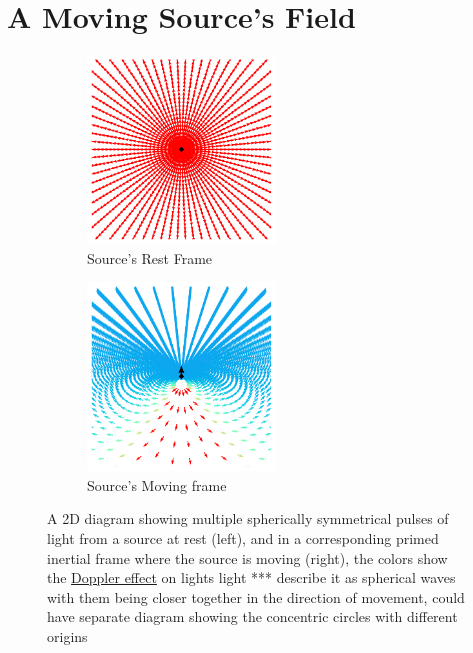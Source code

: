 

\chapter{A Moving Source's Field}

\begin{figure}[H]
	\begin{subfigure}{.49\textwidth}
		\centering
		\includegraphics[width=5cm]{images/pdf/Field_Rest_Frame.pdf}
		\caption{Source's Rest Frame}
	\end{subfigure}
	\begin{subfigure}{.49\textwidth}
		\centering
		\includegraphics[width=5cm]{images/pdf/Field_Moving_Frame_Doppler.pdf}
		\caption{Source's Moving frame}
	\end{subfigure}
	\caption{A 2D diagram showing multiple spherically symmetrical pulses of light from a source at rest (left), and in a corresponding primed inertial frame where the source is moving (right), the colors show the \protect\hyperlink{def-doppler-effect}{Doppler effect} on lights light *** describe it as spherical waves with them being closer together in the direction of movement, could have separate diagram showing the concentric circles with different origins}
	\label{fig: full field transformation 2}
\end{figure}

